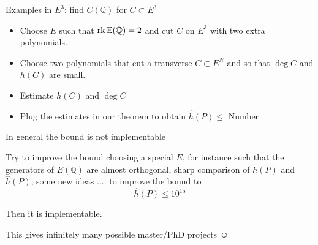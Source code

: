 \documentclass[handout]{beamer}
\newcommand{\qe}{\mathbb{Q}}
\begin{document}
\begin{frame}{Examples in $E^3$: find $C(\mathbb{Q})$ for $C\subset E^3$} 
\begin{itemize}

\item Choose $E$ such that $\rm{rk}\, E(\mathbb{Q})=2$ and cut $C$ on $E^3$ with two extra polynomials.

\item Choose two polynomials that cut a transverse $C \subset E^N$ and so that $\deg C$ and $h(C)$ are small. 

\item Estimate $h(C)$ and $\deg C$

\item Plug the estimates in our theorem to obtain $\hat{h}(P)\le$ Number
\end{itemize}

\pause

\begin{alertblock}{In general the bound is not implementable }\end{alertblock}

\pause

Try to improve the bound choosing a special $E$, for instance such that
the generators of $E(\qe)$  are almost orthogonal, 
 sharp comparison of $h(P)$ and $\hat{h}(P)$, some new ideas .... to improve the bound to 
$$\hat{h}(P)\le 10^{15}$$

Then  it is implementable.

\pause
This gives infinitely many possible master/PhD projects {\Large$\smiley$}
\end{frame}
\end{document}
